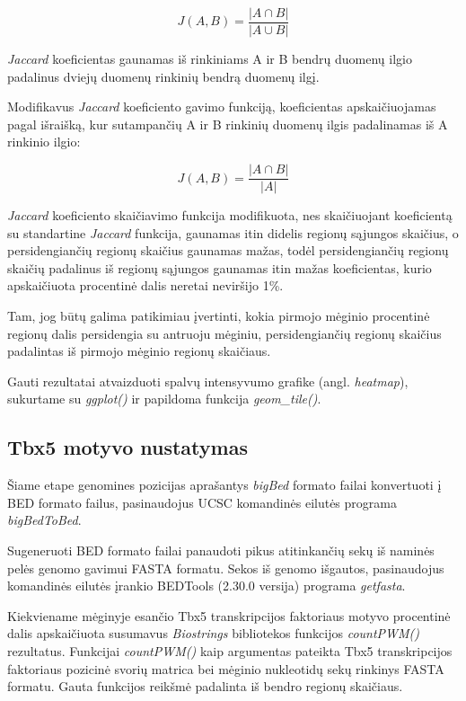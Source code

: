 \documentclass[12pt]{article}
\begin{document}
                \[ J(A, B) =  \frac{|A \cap B|}{|A \cup B|} \]

\emph{Jaccard} koeficientas gaunamas iš rinkiniams A ir B bendrų duomenų ilgio
padalinus dviejų duomenų rinkinių bendrą duomenų ilgį.

Modifikavus \emph{Jaccard} koeficiento gavimo funkciją, koeficientas
apskaičiuojamas pagal išraišką, kur sutampančių A ir B rinkinių duomenų ilgis
padalinamas iš A rinkinio ilgio:

                    \[ J(A, B) = \frac{|A \cap B|}{|A|} \]

\emph{Jaccard} koeficiento skaičiavimo funkcija modifikuota, nes skaičiuojant
koeficientą su standartine \emph{Jaccard} funkcija, gaunamas itin didelis
regionų sąjungos skaičius, o persidengiančių regionų skaičius gaunamas mažas,
todėl persidengiančių regionų skaičių padalinus iš regionų sąjungos gaunamas
itin mažas koeficientas, kurio apskaičiuota procentinė dalis neretai neviršijo
1\%.

Tam, jog būtų galima patikimiau įvertinti, kokia pirmojo mėginio procentinė
regionų dalis persidengia su antruoju mėginiu, persidengiančių regionų skaičius
padalintas iš pirmojo mėginio regionų skaičiaus.

Gauti rezultatai atvaizduoti spalvų intensyvumo grafike (angl. \emph{heatmap}),
sukurtame su \emph{ggplot()} ir papildoma funkcija \emph{geom\_tile()}.

\subsection{Tbx5 motyvo nustatymas}
Šiame etape genomines pozicijas aprašantys \emph{bigBed} formato failai
konvertuoti į BED formato failus, pasinaudojus UCSC komandinės eilutės programa
\emph{bigBedToBed}\cite {BBTOBED}.

Sugeneruoti BED formato failai panaudoti pikus atitinkančių sekų iš naminės
pelės genomo gavimui FASTA formatu. Sekos iš genomo išgautos, pasinaudojus
komandinės eilutės įrankio BEDTools\cite{BEDTOOLS} (2.30.0 versija) programa
\emph{getfasta}\cite{GET_FASTA}.

Kiekviename mėginyje esančio Tbx5 transkripcijos faktoriaus motyvo procentinė
dalis apskaičiuota susumavus \emph{Biostrings}\cite{BIOSTR} bibliotekos
funkcijos \emph{countPWM()} rezultatus. Funkcijai \emph{countPWM()} kaip
argumentas pateikta Tbx5 transkripcijos faktoriaus pozicinė svorių matrica bei
mėginio nukleotidų sekų rinkinys FASTA formatu. Gauta funkcijos reikšmė
padalinta iš bendro regionų skaičiaus.
\end{document}
